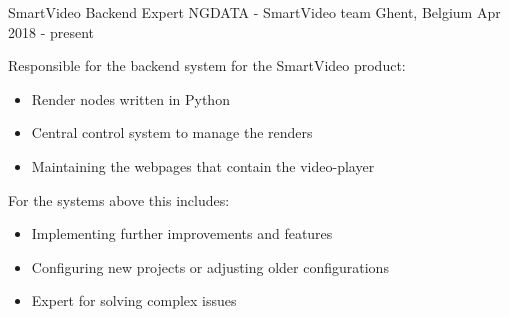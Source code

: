 \begin{cventries}

\cventry
{SmartVideo Backend Expert} %
{NGDATA - SmartVideo team} %
{Ghent, Belgium} %
{Apr 2018 - present} %
{ %
\begin{cvitems}
\item {Responsible for the backend system for the SmartVideo product:}
\begin{itemize}
\item {Render nodes written in Python}
\item {Central control system to manage the renders}
\item {Maintaining the webpages that contain the video-player}
\end{itemize}
\item {For the systems above this includes:}
\begin{itemize}
\item {Implementing further improvements and features}
\item {Configuring new projects or adjusting older configurations}
\item {Expert for solving complex issues}
\end{itemize}
\end{cvitems}
}


\end{cventries}